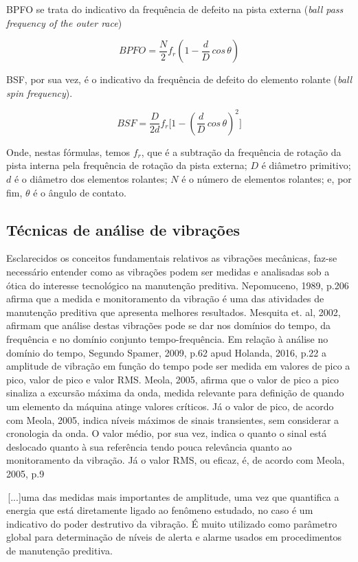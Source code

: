 \documentclass[
	12pt,				
	oneside,			
	a4paper,			
	english,			
	brazil				
	]{abntex2ppgsi}
\begin{document}
BPFO se trata do indicativo da frequência de defeito na pista externa (\textit{ball pass frequency of the outer race})

\[BPFO = \frac{N}{2}f_{r} \left ( 1 - \frac{d}{D} \,cos \, \theta \right )  \]

BSF, por sua vez, é o indicativo da frequência de defeito do elemento rolante (\textit{ball spin frequency}).

\[BSF = \frac{D}{2d}f_{r} \Bigg[  1 - \left ( \frac{d}{D} \,cos \, \theta \right ) ^{2}  \Bigg] \]

Onde, nestas fórmulas, temos $f_{r}$, que é a subtração da frequência de rotação da pista interna pela frequência de rotação da pista externa; $D$ é diâmetro primitivo; $d$ é o diâmetro dos elementos rolantes; $N$ é o número de elementos rolantes; e, por fim, $\theta$ é o ângulo de contato.

\subsection{\textbf{Técnicas de análise de vibrações}}

Esclarecidos os conceitos  fundamentais relativos as vibrações mecânicas, faz-se necessário entender como as vibrações podem ser medidas e analisadas sob a ótica do interesse tecnológico na manutenção preditiva. Nepomuceno, 1989, p.206 afirma que a medida e monitoramento da vibração é uma das atividades de manutenção preditiva que apresenta melhores resultados. 
Mesquita et. al, 2002, afirmam que análise destas vibrações pode se dar nos domínios do tempo, da frequência e no domínio conjunto tempo-frequência.
Em relação à análise no domínio do tempo, Segundo Spamer, 2009, p.62 apud Holanda, 2016, p.22 a amplitude de vibração em função do tempo pode ser medida em valores de pico a pico, valor de pico e valor RMS. 
Meola, 2005, afirma que o valor de pico a pico sinaliza a excursão máxima da onda, medida relevante para definição de quando um elemento da máquina atinge valores críticos. 
Já o valor de pico, de acordo com Meola, 2005, indica níveis máximos de sinais transientes, sem considerar a cronologia da onda. 
O valor médio, por sua vez, indica o quanto o sinal está deslocado quanto à sua referência tendo pouca relevância quanto ao monitoramento da vibração. 
Já o valor RMS, ou eficaz, é, de acordo com Meola, 2005, p.9

\begin{citacao}
\,[...]uma das medidas mais importantes de amplitude, uma vez que quantifica a energia que está diretamente ligado ao fenômeno estudado, no caso é um indicativo do poder destrutivo da vibração. É muito utilizado como parâmetro global para determinação de níveis de alerta e alarme usados em procedimentos de manutenção preditiva.
\end{citacao}
\end{document}

